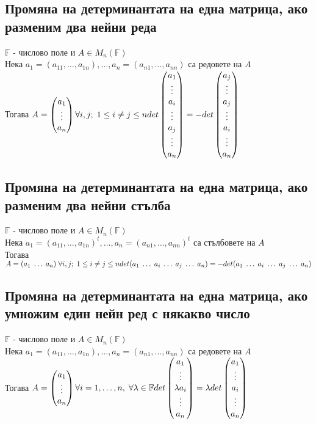 \documentclass{article}
\newcommand{\F}{\mathbb{F}}
\newcommand{\ieqn}{i = 1, \dots, n}
\newcommand{\forallij}{\forall i, j; \; 1 \leq i \neq j \leq n}
\newcommand{\arows}{Нека \(a_1 = (a_{11}, \dots, a_{1n}), \dots, a_n = (a_{n1}, \dots, a_{nn})\) са редовете на \(A\)\\ Тогава }
\newcommand{\acols}{Нека \(a_1 = (a_{11}, \dots, a_{1n})^t, \dots, a_n = (a_{n1}, \dots, a_{nn})^t\) са стълбовете на \(A\)\\ Тогава }
\newcommand{\leta}{\(\F\) - числово поле и \(A \in M_n(\F)\)}
\begin{document}
    \subsection{Промяна на детерминантата на една матрица, ако разменим два нейни реда}
    \leta\\
    \arows \(A = \begin{pmatrix} a_1\\ \vdots\\ a_n \end{pmatrix} \forallij\\
    det\begin{pmatrix} a_1\\ \vdots\\ a_i\\ \vdots\\ a_j\\ \vdots\\ a_n \end{pmatrix} = -det\begin{pmatrix} a_j\\ \vdots\\ a_j\\ \vdots\\ a_i\\ \vdots\\ a_n \end{pmatrix}\)
    \subsection{Промяна на детерминантата на една матрица, ако разменим два нейни стълба}
    \leta\\
    \acols \(A = (a_1 \; \dots \; a_n) \; \forallij\\
    det(a_1 \; \dots \; a_i \; \dots \; a_j \; \dots \; a_n) = -det(a_1 \; \dots \; a_i \; \dots \; a_j \; \dots \; a_n)\)
    \subsection{Промяна на детерминантата на една матрица, ако умножим един нейн ред с някакво число}
    \leta\\
    \arows \(A = \begin{pmatrix} a_1\\ \vdots\\ a_n \end{pmatrix} \forall \ieqn, \; \forall \lambda \in \F\\
    det\begin{pmatrix} a_1\\ \vdots\\ \lambda a_i\\  \vdots\\ a_n \end{pmatrix} = \lambda det\begin{pmatrix} a_1\\ \vdots\\ a_i\\  \vdots\\ a_n \end{pmatrix}\)
\end{document}
